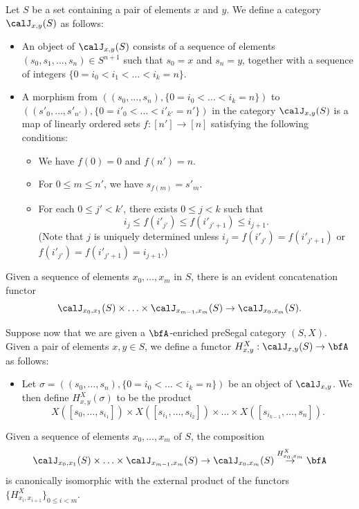 \begin{notation}
Let $S$ be a set containing a pair of elements $x$ and $y$. We define a category
$\calJ_{x,y}(S)$ as follows:
\begin{itemize}
\item An object of $\calJ_{x,y}(S)$ consists of a sequence of elements
$(s_0, s_1, \ldots, s_n) \in S^{n+1}$ such that $s_0 = x$ and $s_n = y$, together with
a sequence of integers $\{ 0 = i_0 < i_1 < \ldots < i_k = n \}$.

\item A morphism from $( (s_0, \ldots, s_n), \{ 0 = i_0 < \ldots < i_k = n\} )$ to
$( ( s'_0, \ldots, s'_{n'}), \{ 0 = i'_0 < \ldots < i'_{k'} = n' \})$ in the category $\calJ_{x,y}(S)$
is a map of linearly ordered sets $f: [n'] \rightarrow [n]$ satisfying the following conditions:
\begin{itemize}
\item We have $f(0) = 0$ and $f(n') = n$.
\item For $0 \leq m \leq n'$, we have $s_{f(m)} = s'_{m}$.
\item For each $0 \leq j' < k'$, there exists $0 \leq j < k$ such that
$$i_{j} \leq f( i'_{j'} ) \leq f( i'_{j'+1}) \leq i_{j+1}.$$
(Note that $j$ is uniquely determined unless
$i_j = f(i'_{j'}) = f(i'_{j'+1})$ or $f(i'_{j'}) = f(i'_{j'+1}) = i_{j+1}$.)
\end{itemize}
\end{itemize}
Given a sequence of elements $x_0, \ldots, x_m$ in $S$, there is an evident concatenation
functor
$$ \calJ_{x_0,x_1}(S) \times \ldots \times \calJ_{ x_{m-1}, x_m}(S) \rightarrow \calJ_{x_0, x_m}(S).$$

Suppose now that we are given a $\bfA$-enriched preSegal category
$(S,X)$. Given a pair of elements $x,y \in S$, we define a functor
$H^{X}_{x,y}: \calJ_{x,y}(S) \rightarrow \bfA$ as follows:
\begin{itemize}
\item[$(\ast)$] Let $\sigma = ( (s_0, \ldots, s_n), \{ 0 = i_0 < \ldots < i_k = n\} )$ be an object of $\calJ_{x,y}$. We then define $H^{X}_{x,y}(\sigma)$ to be the product
$$X( [s_0, \ldots, s_{i_1}] ) \times X( [ s_{i_1}, \ldots, s_{i_2}] ) \times \ldots \times X( [s_{i_{k-1}}, \ldots, s_{n}]).$$
\end{itemize}
\end{notation}

\begin{remark}\label{kuli}
Given a sequence of elements $x_0, \ldots, x_m$ of $S$, the composition
$$ \calJ_{x_0, x_1}(S) \times \ldots \times \calJ_{x_{m-1}, x_m}(S)
\rightarrow \calJ_{x_0, x_m}(S) \stackrel{ H^X_{x_0, x_m}}{\rightarrow} \bfA$$
is canonically isomorphic with the external product of the functors $\{ H^{X}_{x_i, x_{i+1}} \}_{0 \leq i < m}.$
\end{remark}

